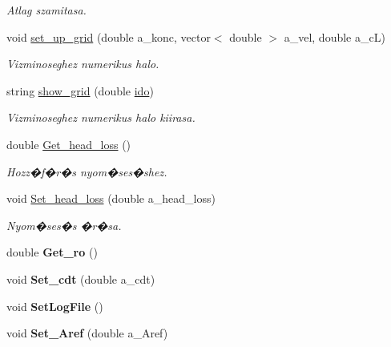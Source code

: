 \begin{DoxyCompactItemize}
\begin{DoxyCompactList}\small\item\em Atlag szamitasa. \end{DoxyCompactList}\item 
\mbox{\label{class_agelem_a144892d0f79ad876bcdb3fe70e282edf}} 
void \hyperlink{class_agelem_a144892d0f79ad876bcdb3fe70e282edf}{set\+\_\+up\+\_\+grid} (double a\+\_\+konc, vector$<$ double $>$ a\+\_\+vel, double a\+\_\+cL)
\begin{DoxyCompactList}\small\item\em Vizminoseghez numerikus halo. \end{DoxyCompactList}\item 
\mbox{\label{class_agelem_a1500c8131aaa82f6150193a8cf13050b}} 
string \hyperlink{class_agelem_a1500c8131aaa82f6150193a8cf13050b}{show\+\_\+grid} (double \hyperlink{class_agelem_a0cdf382c62ac004b8a120319be0cea84}{ido})
\begin{DoxyCompactList}\small\item\em Vizminoseghez numerikus halo kiirasa. \end{DoxyCompactList}\item 
\mbox{\label{class_agelem_a9c448326eb07e271b4e2dc8a9dd2a0d9}} 
double \hyperlink{class_agelem_a9c448326eb07e271b4e2dc8a9dd2a0d9}{Get\+\_\+head\+\_\+loss} ()
\begin{DoxyCompactList}\small\item\em Hozz�f�r�s nyom�ses�shez. \end{DoxyCompactList}\item 
\mbox{\label{class_agelem_a3ff5a59abe058d7b4b6812962e291fc1}} 
void \hyperlink{class_agelem_a3ff5a59abe058d7b4b6812962e291fc1}{Set\+\_\+head\+\_\+loss} (double a\+\_\+head\+\_\+loss)
\begin{DoxyCompactList}\small\item\em Nyom�ses�s �r�sa. \end{DoxyCompactList}\item 
\mbox{\label{class_agelem_a9d3b5645c32c2d07b163e1270138a2b2}} 
double {\bfseries Get\+\_\+ro} ()
\item 
\mbox{\label{class_agelem_a045cfd41234f268b8f923a452df080c5}} 
void {\bfseries Set\+\_\+cdt} (double a\+\_\+cdt)
\item 
\mbox{\label{class_agelem_aa10cee71481c553a0003c547ac3058dd}} 
void {\bfseries Set\+Log\+File} ()
\item 
\mbox{\label{class_agelem_ab0d58b657fe3300b4e10b70898cf5119}} 
void {\bfseries Set\+\_\+\+Aref} (double a\+\_\+\+Aref)
\end{DoxyCompactItemize}
